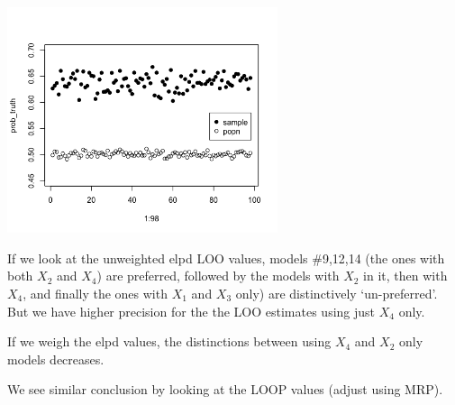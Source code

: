 \documentclass[
]{article}
\newenvironment{Shaded}{\begin{snugshade}}{\end{snugshade}}
\newcommand{\CommentTok}[1]{\textcolor[rgb]{0.56,0.35,0.01}{\textit{#1}}}
\newcommand{\DecValTok}[1]{\textcolor[rgb]{0.00,0.00,0.81}{#1}}
\newcommand{\DocumentationTok}[1]{\textcolor[rgb]{0.56,0.35,0.01}{\textbf{\textit{#1}}}}
\newcommand{\FloatTok}[1]{\textcolor[rgb]{0.00,0.00,0.81}{#1}}
\newcommand{\FunctionTok}[1]{\textcolor[rgb]{0.00,0.00,0.00}{#1}}
\newcommand{\NormalTok}[1]{#1}
\newcommand{\OtherTok}[1]{\textcolor[rgb]{0.56,0.35,0.01}{#1}}
\newcommand{\SpecialCharTok}[1]{\textcolor[rgb]{0.00,0.00,0.00}{#1}}
\begin{document}
\begin{Shaded}
\end{Shaded}

\includegraphics[width=3.125in,height=\textheight]{images/3b/probTruth.png}

If we look at the unweighted elpd LOO values, models \#9,12,14 (the ones
with both \(X_2\) and \(X_4\)) are preferred, followed by the models
with \(X_2\) in it, then with \(X_4\), and finally the ones with \(X_1\)
and \(X_3\) only) are distinctively `un-preferred'. But we have higher
precision for the the LOO estimates using just \(X_4\) only.

If we weigh the elpd values, the distinctions between using \(X_4\) and
\(X_2\) only models decreases.

We see similar conclusion by looking at the LOOP values (adjust using
MRP).
\end{document}
